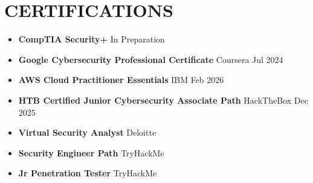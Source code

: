 \documentclass[11pt]{article}
\begin{document}
\vfill
{\footnotesize
\section*{CERTIFICATIONS}
\vspace{-10pt}
\noindent
\begin{minipage}[t]{0.70\textwidth}
\begin{itemize}[leftmargin=*, itemsep=0pt, topsep=0pt, parsep=0pt, partopsep=0pt]
\item \textbf{CompTIA Security+} \textbar{} In Preparation
\item \textbf{Google Cybersecurity Professional Certificate} \textbar{} Coursera \textbar{} Jul 2024
\item \textbf{AWS Cloud Practitioner Essentials} \textbar{} IBM \textbar{} Feb 2026
\item \textbf{HTB Certified Junior Cybersecurity Associate Path} \textbar{} HackTheBox \textbar{} Dec 2025
\end{itemize}
\end{minipage}
\hfill
\begin{minipage}[t]{0.46\textwidth}
\begin{itemize}[leftmargin=*, itemsep=0pt, topsep=0pt, parsep=0pt, partopsep=0pt]
\item \textbf{Virtual Security Analyst} \textbar{} Deloitte
\item \textbf{Security Engineer Path} \textbar{} TryHackMe
\item \textbf{Jr Penetration Tester} \textbar{} TryHackMe
\end{itemize}
\end{minipage}
}
\end{document}
